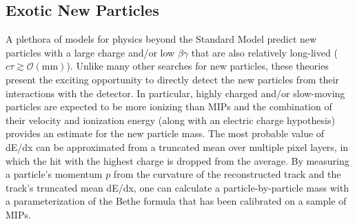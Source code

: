 \documentclass[12pt]{article}
\begin{document}
\subsection{Exotic New Particles}
\label{sec:llp}


A plethora of models for physics beyond the Standard Model predict new particles with a large charge and/or low $\beta\gamma$ that are also relatively long-lived ($c\tau\gtrsim \mathcal{O}(\text{mm})$).  Unlike many other searches for new particles, these theories present the exciting opportunity to directly detect the new particles from their interactions with the detector.  In particular, highly charged and/or slow-moving particles are expected to be more ionizing than MIPs and the combination of their velocity and ionization energy (along with an electric charge hypothesis) provides an estimate for the new particle mass. The most probable value of dE/dx can be approximated from a truncated mean over multiple pixel layers, in which the hit with the highest charge is dropped from the average.  By measuring a particle's momentum $p$ from the curvature of the reconstructed track and the track's truncated mean dE/dx, one can calculate a particle-by-particle mass with a parameterization of the Bethe formula that has been calibrated on a sample of MIPs.
\end{document}
